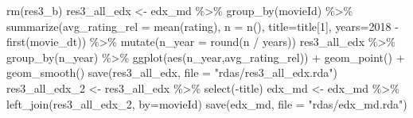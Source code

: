 \documentclass[
]{article}
\newenvironment{Shaded}{}{}
\newcommand{\AttributeTok}[1]{\textcolor[rgb]{0.49,0.56,0.16}{#1}}
\newcommand{\DecValTok}[1]{\textcolor[rgb]{0.25,0.63,0.44}{#1}}
\newcommand{\FunctionTok}[1]{\textcolor[rgb]{0.02,0.16,0.49}{#1}}
\newcommand{\NormalTok}[1]{#1}
\newcommand{\OtherTok}[1]{\textcolor[rgb]{0.00,0.44,0.13}{#1}}
\newcommand{\SpecialCharTok}[1]{\textcolor[rgb]{0.25,0.44,0.63}{#1}}
\newcommand{\StringTok}[1]{\textcolor[rgb]{0.25,0.44,0.63}{#1}}
\begin{document}
\begin{Shaded}
\begin{Highlighting}[]
\FunctionTok{rm}\NormalTok{(res3\_b)}
\NormalTok{res3\_all\_edx }\OtherTok{\textless{}{-}}\NormalTok{ edx\_md }\SpecialCharTok{\%\textgreater{}\%}
  \FunctionTok{group\_by}\NormalTok{(movieId) }\SpecialCharTok{\%\textgreater{}\%}
  \FunctionTok{summarize}\NormalTok{(}\AttributeTok{avg\_rating\_rel =} \FunctionTok{mean}\NormalTok{(rating), }\AttributeTok{n =} \FunctionTok{n}\NormalTok{(), }\AttributeTok{title=}\NormalTok{title[}\DecValTok{1}\NormalTok{], }\AttributeTok{years=}\DecValTok{2018} \SpecialCharTok{{-}} \FunctionTok{first}\NormalTok{(movie\_dt)) }\SpecialCharTok{\%\textgreater{}\%}
  \FunctionTok{mutate}\NormalTok{(}\AttributeTok{n\_year =} \FunctionTok{round}\NormalTok{(n }\SpecialCharTok{/}\NormalTok{ years))}
\NormalTok{res3\_all\_edx }\SpecialCharTok{\%\textgreater{}\%} 
  \FunctionTok{group\_by}\NormalTok{(n\_year) }\SpecialCharTok{\%\textgreater{}\%} 
  \FunctionTok{ggplot}\NormalTok{(}\FunctionTok{aes}\NormalTok{(n\_year,avg\_rating\_rel)) }\SpecialCharTok{+} \FunctionTok{geom\_point}\NormalTok{() }\SpecialCharTok{+} \FunctionTok{geom\_smooth}\NormalTok{()}
\FunctionTok{save}\NormalTok{(res3\_all\_edx, }\AttributeTok{file =} \StringTok{"rdas/res3\_all\_edx.rda"}\NormalTok{)}
\NormalTok{res3\_all\_edx\_2 }\OtherTok{\textless{}{-}}\NormalTok{ res3\_all\_edx }\SpecialCharTok{\%\textgreater{}\%} \FunctionTok{select}\NormalTok{(}\SpecialCharTok{{-}}\NormalTok{title)}
\NormalTok{edx\_md }\OtherTok{\textless{}{-}}\NormalTok{ edx\_md }\SpecialCharTok{\%\textgreater{}\%} \FunctionTok{left\_join}\NormalTok{(res3\_all\_edx\_2, }\AttributeTok{by=}\StringTok{\textquotesingle{}movieId\textquotesingle{}}\NormalTok{)}
\FunctionTok{save}\NormalTok{(edx\_md, }\AttributeTok{file =} \StringTok{"rdas/edx\_md.rda"}\NormalTok{)}


\end{Highlighting}
\end{Shaded}
\end{document}
